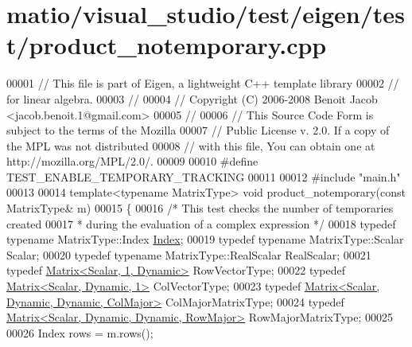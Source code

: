 \hypertarget{matio_2visual__studio_2test_2eigen_2test_2product__notemporary_8cpp_source}{}\section{matio/visual\+\_\+studio/test/eigen/test/product\+\_\+notemporary.cpp}
\label{matio_2visual__studio_2test_2eigen_2test_2product__notemporary_8cpp_source}

\begin{DoxyCode}
00001 \textcolor{comment}{// This file is part of Eigen, a lightweight C++ template library}
00002 \textcolor{comment}{// for linear algebra.}
00003 \textcolor{comment}{//}
00004 \textcolor{comment}{// Copyright (C) 2006-2008 Benoit Jacob <jacob.benoit.1@gmail.com>}
00005 \textcolor{comment}{//}
00006 \textcolor{comment}{// This Source Code Form is subject to the terms of the Mozilla}
00007 \textcolor{comment}{// Public License v. 2.0. If a copy of the MPL was not distributed}
00008 \textcolor{comment}{// with this file, You can obtain one at http://mozilla.org/MPL/2.0/.}
00009 
00010 \textcolor{preprocessor}{#define TEST\_ENABLE\_TEMPORARY\_TRACKING}
00011 
00012 \textcolor{preprocessor}{#include "main.h"}
00013 
00014 \textcolor{keyword}{template}<\textcolor{keyword}{typename} MatrixType> \textcolor{keywordtype}{void} product\_notemporary(\textcolor{keyword}{const} MatrixType& m)
00015 \{
00016   \textcolor{comment}{/* This test checks the number of temporaries created}
00017 \textcolor{comment}{   * during the evaluation of a complex expression */}
00018   \textcolor{keyword}{typedef} \textcolor{keyword}{typename} MatrixType::Index \hyperlink{namespace_eigen_a62e77e0933482dafde8fe197d9a2cfde}{Index};
00019   \textcolor{keyword}{typedef} \textcolor{keyword}{typename} MatrixType::Scalar Scalar;
00020   \textcolor{keyword}{typedef} \textcolor{keyword}{typename} MatrixType::RealScalar RealScalar;
00021   \textcolor{keyword}{typedef} \hyperlink{group___core___module_class_eigen_1_1_matrix}{Matrix<Scalar, 1, Dynamic>} RowVectorType;
00022   \textcolor{keyword}{typedef} \hyperlink{group___core___module}{Matrix<Scalar, Dynamic, 1>} ColVectorType;
00023   \textcolor{keyword}{typedef} \hyperlink{group___core___module_class_eigen_1_1_matrix}{Matrix<Scalar, Dynamic, Dynamic, ColMajor>} 
      ColMajorMatrixType;
00024   \textcolor{keyword}{typedef} \hyperlink{group___core___module_class_eigen_1_1_matrix}{Matrix<Scalar, Dynamic, Dynamic, RowMajor>} 
      RowMajorMatrixType;
00025 
00026   Index rows = m.rows();

\end{DoxyCode}
